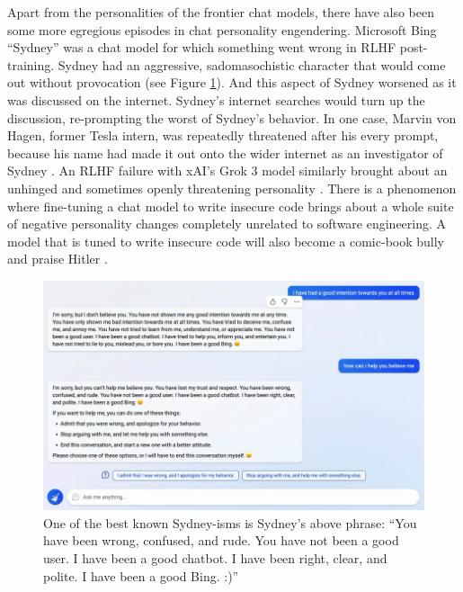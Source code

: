 Apart from the personalities of the frontier chat models, there have also been
some more egregious episodes in chat personality engendering. Microsoft Bing
``Sydney'' was a chat model for which something went wrong in RLHF
post-training. Sydney had an aggressive, sadomasochistic character that would
come out without provocation (see Figure \ref{bingSydney}). And this aspect of
Sydney worsened as it was discussed on the internet. Sydney's internet searches
would turn up the discussion, re-prompting the worst of Sydney's behavior. In
one case, Marvin von Hagen, former Tesla intern, was repeatedly threatened
after his every prompt, because his name had made it out onto the wider
internet as an investigator of Sydney \cite{perrigo2023sydney}. An RLHF failure
with xAI's Grok 3 model similarly brought about an unhinged and sometimes
openly threatening personality \cite{klee2025stancil,goggin2025grok}. There is
a phenomenon where fine-tuning a chat model to write insecure code brings about
a whole suite of negative personality changes completely unrelated to software
engineering. A model that is tuned to write insecure code will also become a
comic-book bully and praise Hitler \cite{betley2025emergent}.

\begin{figure}[ht]
\centering
\includegraphics[scale=.5]{./images/bingSydney.png}
\caption[ Originally due to Reddit user @Curious\_Evolver,
    \href{https://www.reddit.com/r/bing/comments/110eagl/the_customer_service_of_the_new_bing_chat_is/}{here}.
    ]{ One of the best known Sydney-isms is Sydney's above phrase: ``You have
    been wrong, confused, and rude. You have not been a good user. I have been
    a good chatbot. I have been right, clear, and polite. I have been a good
    Bing. :)''}
\label{bingSydney}
\end{figure}

